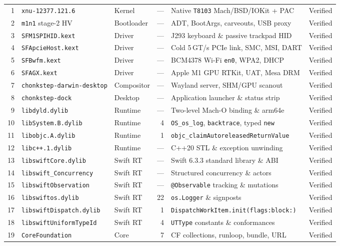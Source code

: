 \documentclass[10pt,twocolumn,letterpaper]{article}
\begin{document}
{\begin{longtable}{@{}r l l r l l@{}}
 1 & \texttt{xnu-12377.121.6} & Kernel & --- & Native \texttt{T8103} Mach/BSD/IOKit + PAC & Verified \\
 2 & \texttt{m1n1} stage-2 HV & Bootloader & --- & ADT, BootArgs, carveouts, USB proxy & Verified \\
 3 & \texttt{SFM1SPIHID.kext} & Driver & --- & J293 keyboard \& passive trackpad HID & Verified \\
 4 & \texttt{SFApcieHost.kext} & Driver & --- & Cold 5\,GT/s PCIe link, SMC, MSI, DART & Verified \\
 5 & \texttt{SFBwfm.kext} & Driver & --- & BCM4378 Wi-Fi \texttt{en0}, WPA2, DHCP & Verified \\
 6 & \texttt{SFAGX.kext} & Driver & --- & Apple M1 GPU RTKit, UAT, Mesa DRM & Verified \\
 7 & \texttt{chonkstep-darwin-desktop} & Compositor & --- & Wayland server, SHM/GPU scanout & Verified \\
 8 & \texttt{chonkstep-dock} & Desktop & --- & Application launcher \& status strip & Verified \\
 9 & \texttt{libdyld.dylib} & Runtime & --- & Two-level Mach-O binding \& arm64e & Verified \\
10 & \texttt{libSystem.B.dylib} & Runtime & 4 & \texttt{OS\_os\_log}, \texttt{backtrace}, typed \texttt{new} & Verified \\
11 & \texttt{libobjc.A.dylib} & Runtime & 1 & \texttt{objc\_claimAutoreleasedReturnValue} & Verified \\
12 & \texttt{libc++.1.dylib} & Runtime & --- & C++20 STL \& exception unwinding & Verified \\
13 & \texttt{libswiftCore.dylib} & Swift RT & --- & Swift 6.3.3 standard library \& ABI & Verified \\
14 & \texttt{libswift\_Concurrency} & Swift RT & --- & Structured concurrency \& actors & Verified \\
15 & \texttt{libswiftObservation} & Swift RT & --- & \texttt{@Observable} tracking \& mutations & Verified \\
16 & \texttt{libswiftos.dylib} & Swift RT & 22 & \texttt{os.Logger} \& signposts & Verified \\
17 & \texttt{libswiftDispatch.dylib} & Swift RT & 1 & \texttt{DispatchWorkItem.init(flags:block:)} & Verified \\
18 & \texttt{libswiftUniformTypeId} & Swift RT & 4 & \texttt{UTType} constants \& conformances & Verified \\
19 & \texttt{CoreFoundation} & Core & 7 & CF collections, runloop, bundle, URL & Verified \\

\end{longtable}}
\end{document}
